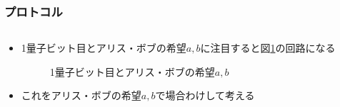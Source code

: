 \begin{frame}
  \frametitle{プロトコル}

  \begin{columns}
    \begin{column}{0.5\textwidth}
    \end{column}
    \begin{column}{0.5\textwidth}
      \pause
    \end{column}
  \end{columns}

  \begin{itemize}
    \item<+-> 1量子ビット目とアリス・ボブの希望$a,b$に注目すると図\ref{fig:1st_qubit}の回路になる
    \begin{figure}
      \centering
      \caption{1量子ビット目とアリス・ボブの希望$a, b$}
      \label{fig:1st_qubit}
    \end{figure}

    \item<+-> これをアリス・ボブの希望$a, b$で場合わけして考える
  \end{itemize}
\end{frame}

